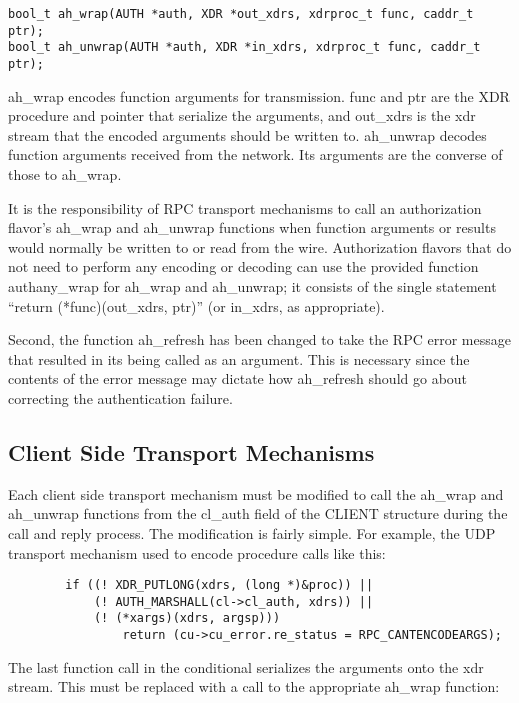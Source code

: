 \begin{verbatim}
bool_t ah_wrap(AUTH *auth, XDR *out_xdrs, xdrproc_t func, caddr_t ptr);
bool_t ah_unwrap(AUTH *auth, XDR *in_xdrs, xdrproc_t func, caddr_t ptr);
\end{verbatim}

ah_wrap encodes function arguments for transmission.  func and ptr are
the XDR procedure and pointer that serialize the arguments, and
out_xdrs is the xdr stream that the encoded arguments should be
written to.  ah_unwrap decodes function arguments received from the
network.  Its arguments are the converse of those to ah_wrap.

It is the responsibility of RPC transport mechanisms to call an
authorization flavor's ah_wrap and ah_unwrap functions when function
arguments or results would normally be written to or read from the
wire.  Authorization flavors that do not need to perform any encoding
or decoding can use the provided function authany_wrap for ah_wrap
and ah_unwrap; it consists of the single statement ``return
(*func)(out_xdrs, ptr)'' (or in_xdrs, as appropriate).

Second, the function ah_refresh has been changed to take the RPC error
message that resulted in its being called as an argument.  This is
necessary since the contents of the error message may dictate how
ah_refresh should go about correcting the authentication failure.

\subsection{Client Side Transport Mechanisms}

Each client side transport mechanism must be modified to call the
ah_wrap and ah_unwrap functions from the cl_auth field of the CLIENT
structure during the call and reply process.  The modification is
fairly simple.  For example, the UDP transport mechanism used to
encode procedure calls like this:

\begin{verbatim}
        if ((! XDR_PUTLONG(xdrs, (long *)&proc)) ||
            (! AUTH_MARSHALL(cl->cl_auth, xdrs)) ||
            (! (*xargs)(xdrs, argsp)))
                return (cu->cu_error.re_status = RPC_CANTENCODEARGS);
\end{verbatim}

The last function call in the conditional serializes the arguments
onto the xdr stream.  This must be replaced with a call to the
appropriate ah_wrap function:


